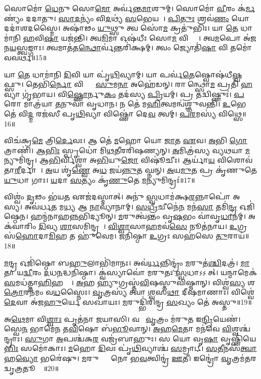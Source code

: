𑌸𑍋𑌮𑍋॑ \ul{𑌧𑍇}𑌨𑍁 𑌸𑍋\ul{𑌮𑍋} 𑌅𑌰𑍍𑌵॑𑌨𑍍𑌤\ul{𑌮𑌾}𑌶𑍁𑌮𑍍।
𑌸𑍋𑌮𑍋॑ \ul{𑌵𑍀}𑌰𑌂 𑌕॑\ul{𑌰𑍍𑌮}𑌣𑍍𑌯𑌂॑ 𑌦𑌦𑌾𑌤𑍁।
\ul{𑌸𑌾}\ul{𑌦}𑌨𑍍𑌯𑌂॑ 𑌵𑌿\ul{𑌦}𑌥𑍍𑌯॑ \ul{𑌸}𑌭𑍇𑌯𑌮𑍍᳚।
\ul{𑌪𑌿}\ul{𑌤𑍁𑌃} 𑌶𑍍𑌰𑌵॑\ul{𑌣𑌂} 𑌯𑍋 𑌦𑌦𑌾॑𑌶𑌦𑌸𑍍𑌮𑍈।
𑌅𑌷𑌾॑𑌢𑌂 \ul{𑌯𑍁}𑌥𑍍𑌸𑍁 𑌤𑍍𑌵 𑌸𑍋॑\ul{𑌮} 𑌕𑍍𑌰𑌤𑍁॑𑌭𑌿𑌃।
𑌯𑌾 \ul{𑌤𑍇} 𑌧𑌾𑌮𑌾॑𑌨𑌿 \ul{𑌹}𑌵𑌿\ul{𑌷𑌾} 𑌯𑌜॑𑌨𑍍𑌤𑌿।
𑌤𑍍𑌵\ul{𑌮𑌿}𑌮𑌾 𑌓𑌷॑𑌧𑍀𑌃 𑌸𑍋\ul{𑌮} 𑌵𑌿𑌶𑍍𑌵𑌾𑌃᳚।
𑌤𑍍𑌵\ul{𑌮}𑌪𑍋 𑌅॑𑌜𑌨\ul{𑌯}𑌸𑍍𑌤𑍍𑌵𑌙𑍍𑌗𑌾𑌃।
𑌤𑍍𑌵𑌮𑌾𑌤॑𑌤\ul{𑌨𑍍𑌥𑍋}𑌰𑍍𑌵॑𑌨𑍍𑌤𑌰𑌿॑𑌕𑍍𑌷𑌮𑍍।
𑌤𑍍𑌵𑌂 𑌜𑍍𑌯𑍋𑌤𑌿॑\ul{𑌷𑌾} 𑌵𑌿 𑌤𑌮𑍋॑ 𑌵𑌵𑌰𑍍𑌥॥15॥

𑌯𑌾 \ul{𑌤𑍇} 𑌧𑌾𑌮𑌾॑𑌨𑌿 \ul{𑌦𑌿}𑌵𑌿 𑌯𑌾 𑌪𑍃॑\ul{𑌥𑌿}𑌵𑍍𑌯𑌾𑌮𑍍।
𑌯𑌾 𑌪𑌰𑍍𑌵॑\ul{𑌤𑍇}𑌷𑍍𑌵𑍋𑌷॑𑌧𑍀\ul{𑌷𑍍𑌵}𑌫𑍍𑌸𑍁।
𑌤𑍇𑌭𑌿॑\ul{𑌰𑍍𑌨𑍋} 𑌵𑌿𑌶𑍍𑌵𑍈𑌃᳚ \ul{𑌸𑍁}𑌮\ul{𑌨𑌾} 𑌅𑌹𑍇॑𑌡𑌨𑍍।
𑌰𑌾𑌜᳚𑌨𑍍𑌥𑍍𑌸𑍋\ul{𑌮} 𑌪𑍍𑌰𑌤𑌿॑ \ul{𑌹}𑌵𑍍𑌯𑌾 𑌗𑍃॑𑌭𑌾𑌯।
𑌵𑌿\ul{𑌷𑍍𑌣𑍋}𑌰𑍍𑌨𑍁\ul{𑌕𑌂} 𑌤𑌦॑𑌸𑍍𑌯 \ul{𑌪𑍍𑌰𑌿}𑌯𑌮𑍍।
𑌪𑍍𑌰 𑌤𑌦𑍍𑌵𑌿𑌷𑍍𑌣𑍁𑌃॑।
\ul{𑌪}𑌰𑍋 𑌮𑌾𑌤𑍍𑌰॑𑌯𑌾 \ul{𑌤}𑌨𑍁𑌵𑌾॑ 𑌵𑍃𑌧𑌾𑌨।
𑌨 𑌤𑍇॑ 𑌮\ul{𑌹𑌿}𑌤𑍍𑌵𑌮𑌨𑍍𑌵॑𑌶𑍍𑌞𑍁𑌵𑌨𑍍𑌤𑌿।
\ul{𑌉}𑌭𑍇 𑌤𑍇॑ 𑌵𑌿\ul{𑌦𑍍𑌮} 𑌰𑌜॑𑌸𑍀 𑌪𑍃\ul{𑌥𑌿}𑌵𑍍𑌯𑌾 𑌵𑌿𑌷𑍍𑌣𑍋॑ 𑌦𑍇\ul{𑌵} 𑌤𑍍𑌵𑌮𑍍।
\ul{𑌪}\ul{𑌰}𑌮𑌸𑍍𑌯॑ 𑌵𑌿𑌥𑍍𑌸𑍇॥16॥

𑌵𑌿𑌚॑𑌕𑍍𑌰\ul{𑌮𑍇} 𑌤𑍍𑌰𑌿\ul{𑌰𑍍𑌦𑍇}𑌵𑌃।
𑌆 𑌤𑍇॑ \ul{𑌮}𑌹𑍋 𑌯𑍋 \ul{𑌜𑌾}𑌤 \ul{𑌏}𑌵।
\ul{𑌅}𑌭𑌿 \ul{𑌗𑍋}𑌤𑍍𑌰𑌾𑌣𑌿॑।
𑌆\ul{𑌭𑌿𑌃} 𑌸𑍍𑌪𑍃𑌧𑍋॑ 𑌮𑌿\ul{𑌥}𑌤𑍀𑌰𑌰𑌿॑𑌷𑌣𑍍𑌯𑌨𑍍।
\ul{𑌅}𑌮𑌿𑌤𑍍𑌰॑𑌸𑍍𑌯 𑌵𑍍𑌯𑌥𑌯𑌾 \ul{𑌮}𑌨𑍍𑌯𑍁𑌮𑌿॑𑌨𑍍𑌦𑍍𑌰।
𑌆\ul{𑌭𑌿}𑌰𑍍𑌵𑌿𑌶𑍍𑌵𑌾॑ 𑌅\ul{𑌭𑌿}𑌯𑍁\ul{𑌜𑍋} 𑌵𑌿𑌷𑍂॑𑌚𑍀𑌃।
𑌆𑌰𑍍𑌯𑌾॑\ul{𑌯} 𑌵𑌿𑌶𑍋𑌵॑𑌤𑌾\ul{𑌰𑍀}𑌰𑍍𑌦𑌾𑌸𑍀𑌃᳚।
\ul{𑌅}𑌯 𑌶𑍃॑\ul{𑌣𑍍𑌵𑍇} 𑌅\ul{𑌧} 𑌜𑌯॑\ul{𑌨𑍍𑌨𑍁}𑌤 𑌘𑍍𑌨𑌨𑍍।
\ul{𑌅}𑌯\ul{𑌮𑍁}𑌤 𑌪𑍍𑌰 𑌕𑍃॑𑌣𑍁𑌤𑍇 \ul{𑌯𑍁}𑌧𑌾 𑌗𑌾𑌃।
\ul{𑌯}𑌦𑌾 \ul{𑌸}𑌤𑍍𑌯𑌂 𑌕𑍃॑\ul{𑌣𑍁}𑌤𑍇 \ul{𑌮}𑌨𑍍𑌯𑍁𑌮𑌿𑌨𑍍𑌦𑍍𑌰𑌃॑॥17॥

𑌵𑌿𑌶𑍍𑌵𑌂॑ \ul{𑌦𑍃}𑌢𑌂 𑌭॑𑌯\ul{𑌤} 𑌏𑌜॑𑌦𑌸𑍍𑌮𑌾𑌤𑍍।
𑌅𑌨𑍁॑ \ul{𑌸𑍍𑌵}𑌧𑌾𑌮॑𑌕𑍍𑌷\ul{𑌰}𑌨𑍍𑌨𑌾𑌪𑍋॑ 𑌅𑌸𑍍𑌯।
𑌅𑌵॑𑌰𑍍𑌧\ul{𑌤} 𑌮\ul{𑌧𑍍𑌯} 𑌆 \ul{𑌨𑌾}𑌵𑍍𑌯𑌾॑𑌨𑌾𑌮𑍍।
\ul{𑌸}\ul{𑌧𑍍𑌰𑍀}𑌚𑍀𑌨𑍇॑\ul{𑌨} 𑌮𑌨॑\ul{𑌸𑌾} 𑌤𑌮𑌿॑\ul{𑌨𑍍𑌦𑍍𑌰} 𑌓𑌜𑌿॑𑌷𑍍𑌠𑍇𑌨।
𑌹𑌨𑍍𑌮॑𑌨𑌾𑌹\ul{𑌨𑍍𑌨}𑌭𑌿𑌦𑍍𑌯𑍂𑌨𑍍।
\ul{𑌮}𑌰𑍁𑌤𑍍𑌵॑𑌨𑍍𑌤𑌂 𑌵𑍃\ul{𑌷}𑌭𑌂 𑌵𑌾॑𑌵𑍃\ul{𑌧𑌾}𑌨𑌮𑍍।
𑌅𑌕॑𑌵𑌾𑌰𑌿𑌂 \ul{𑌦𑌿}𑌵𑍍𑌯 \ul{𑌶𑌾}𑌸𑌮𑌿𑌨𑍍𑌦𑍍𑌰𑌮𑍍᳚।
\ul{𑌵𑌿}\ul{𑌶𑍍𑌵𑌾}𑌸𑌾\ul{𑌹}𑌮𑌵॑\ul{𑌸𑍇} 𑌨𑍂𑌤॑𑌨𑌾𑌯।
\ul{𑌉}𑌗𑍍𑌰 𑌸॑\ul{𑌹𑍋}𑌦𑌾\ul{𑌮𑌿}𑌹 𑌤 𑌹𑍁॑𑌵𑍇𑌮।
𑌜𑌨𑌿॑𑌷𑍍𑌠𑌾 \ul{𑌉}𑌗𑍍𑌰𑌃 𑌸𑌹॑𑌸𑍇 \ul{𑌤𑍁}𑌰𑌾𑌯॑॥18॥

\ul{𑌮}𑌨𑍍𑌦𑍍𑌰 𑌓𑌜𑌿॑𑌷𑍍𑌠𑍋 𑌬\ul{𑌹𑍁}𑌲𑌾𑌭𑌿॑𑌮𑌾𑌨𑌃।
𑌅𑌵॑\ul{𑌰𑍍𑌧}𑌨𑍍𑌨𑌿𑌨𑍍𑌦𑍍𑌰𑌂॑ \ul{𑌮}𑌰𑍁𑌤॑\ul{𑌶𑍍𑌚𑌿}𑌦𑌤𑍍𑌰॑।
\ul{𑌮𑌾}𑌤𑌾 𑌯\ul{𑌦𑍍𑌵𑍀}𑌰𑌂 \ul{𑌦}𑌧\ul{𑌨}𑌦𑍍𑌧𑌨𑌿॑𑌷𑍍𑌠𑌾।
𑌕𑍍𑌵॑𑌸𑍍𑌯𑌾𑌵𑍋॑ 𑌮𑌰𑍁𑌤𑌃 \ul{𑌸𑍍𑌵}𑌧𑌾\-𑌽𑌽𑌸𑍀᳚𑌤𑍍।
𑌯𑌨𑍍𑌮𑌾𑌮𑍇𑌕॑ \ul{𑌸}𑌮𑌧॑𑌤𑍍𑌤𑌾\ul{𑌹𑌿}𑌹𑌤𑍍𑌯𑍇᳚।
\ul{𑌅}𑌹 𑌹𑍍𑌯𑍁॑𑌗𑍍𑌰𑌸𑍍𑌤॑\ul{𑌵𑌿}𑌷𑌸𑍍𑌤𑍁𑌵𑌿॑𑌷𑍍𑌮𑌾𑌨𑍍।
𑌵𑌿𑌶𑍍𑌵॑\ul{𑌸𑍍𑌯} 𑌶\ul{𑌤𑍍𑌰𑍋}𑌰𑌨॑𑌮𑌂 𑌵\ul{𑌧}𑌸𑍍𑌨𑍈𑌃।
\ul{𑌵𑍃}𑌤𑍍𑌰𑌸𑍍𑌯॑ 𑌤𑍍𑌵𑌾 \ul{𑌶𑍍𑌵}𑌸\ul{𑌥𑌾} 𑌦𑍀𑌷॑𑌮𑌾𑌣𑌾𑌃।
𑌵𑌿𑌶𑍍𑌵𑍇॑ \ul{𑌦𑍇}𑌵𑌾 𑌅॑𑌜\ul{𑌹𑍁}𑌰𑍍𑌯𑍇 𑌸𑌖𑌾॑𑌯𑌃।
\ul{𑌮}𑌰𑍁𑌦𑍍𑌭𑌿॑𑌰𑌿𑌨𑍍𑌦𑍍𑌰 \ul{𑌸}𑌖𑍍𑌯𑌂 𑌤𑍇॑ 𑌅𑌸𑍍𑌤𑍁॥19॥

𑌅\ul{𑌥𑍇}𑌮𑌾 𑌵𑌿\ul{𑌶𑍍𑌵𑌾𑌃} 𑌪𑍃𑌤॑𑌨𑌾 𑌜𑌯𑌾𑌸𑌿।
𑌵𑌧𑍀𑌂᳚ \ul{𑌵𑍃}𑌤𑍍𑌰𑌂 𑌮॑𑌰𑍁𑌤 𑌇\ul{𑌨𑍍𑌦𑍍𑌰𑌿}𑌯𑍇𑌣॑।
𑌸𑍍𑌵𑍇\ul{𑌨} 𑌭𑌾𑌮𑍇॑𑌨 𑌤\ul{𑌵𑌿}𑌷𑍋 𑌬॑\ul{𑌭𑍂}𑌵𑌾𑌨𑍍।
\ul{𑌅}𑌹\ul{𑌮𑍇}𑌤𑌾 𑌮𑌨॑𑌵𑍇 \ul{𑌵𑌿}𑌶𑍍𑌵𑌶𑍍𑌚॑𑌨𑍍𑌦𑍍𑌰𑌾𑌃।
\ul{𑌸𑍁}𑌗𑌾 \ul{𑌅}𑌪𑌶𑍍𑌚॑𑌕\ul{𑌰} 𑌵𑌜𑍍𑌰॑𑌬𑌾𑌹𑍁𑌃।
𑌸 𑌯𑍋 𑌵𑍃\ul{𑌷𑌾} 𑌵𑍃𑌷𑍍𑌣𑌿॑𑌯𑍇\ul{𑌭𑌿𑌃} 𑌸𑌮𑍋॑𑌕𑌾𑌃।
\ul{𑌮}𑌹𑍋 \ul{𑌦𑌿}𑌵𑌃 𑌪𑍃॑\ul{𑌥𑌿}𑌵𑍍𑌯𑌾𑌶𑍍𑌚॑ \ul{𑌸}𑌮𑍍𑌰𑌾𑌟𑍍।
\ul{𑌸}\ul{𑌤𑍀}𑌨𑌸॑\ul{𑌤𑍍𑌵𑌾} 𑌹\ul{𑌵𑍍𑌯𑍋} 𑌭𑌰𑍇॑𑌷𑍁।
\ul{𑌮}𑌰𑍁𑌤𑍍𑌵𑌾𑌂᳚ 𑌨𑍋 𑌭\ul{𑌵}𑌤𑍍𑌵𑌿𑌨𑍍𑌦𑍍𑌰॑ \ul{𑌊}𑌤𑍀।
𑌇𑌨𑍍𑌦𑍍𑌰𑍋॑ \ul{𑌵𑍃}𑌤𑍍𑌰𑌮॑𑌤𑌰𑌦𑍍𑌵𑍃\ul{𑌤𑍍𑌰}𑌤𑍂𑌰𑍍𑌯𑍇᳚॥20॥


